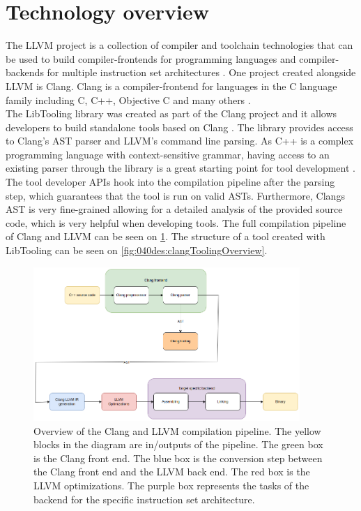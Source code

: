 \section{Technology overview}
The LLVM project is a collection of compiler and toolchain technologies that can be used to build compiler-frontends for programming languages and compiler-backends for multiple instruction set architectures \cite{llvmLLVMCompilerInfrastructure}.
One project created alongside LLVM is Clang. Clang is a compiler-frontend for languages in the C language family including C, C++, Objective C and many others \cite{llvmClangLanguageFamily}.\\
The LibTooling library was created as part of the Clang project and it allows developers to build standalone tools based on Clang \cite{llvmLibToolingClang17}. 
The library provides access to Clang's AST parser and LLVM's command line parsing. As C++ is a complex programming language with context-sensitive grammar, having access to an existing parser through the library is a great starting point for tool development \cite{ProblemsPainsParsing}. The tool developer APIs hook into the compilation pipeline after the parsing step, which guarantees that the tool is run on valid ASTs. Furthermore, Clangs AST is very fine-grained allowing for a detailed analysis of the provided source code, which is very helpful when developing tools. The full compilation pipeline of Clang and LLVM can be seen on \cref{fig:040des:llvmToolchainOverview}. The structure of a tool created with LibTooling can be seen on \cref{fig:040des:clangToolingOverview}.

\begin{figure}[H]
    \centering
    \includegraphics[width=0.9\textwidth]{figs/040des/compilation_overview.png}
    \caption{Overview of the Clang and LLVM compilation pipeline. The yellow blocks in the diagram are in/outputs of the pipeline. The green box is the Clang front end. The blue box is the conversion step between the Clang front end and the LLVM back end. The red box is the LLVM optimizations. The purple box represents the tasks of the backend for the specific instruction set architecture.}
    \label{fig:040des:llvmToolchainOverview}
\end{figure}

